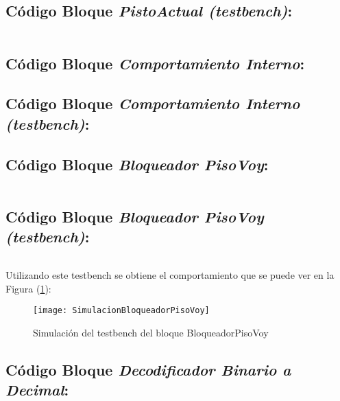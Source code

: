 \subsection{Código Bloque \textit{PistoActual (testbench)}:} \label{code:PisoActual_tb}
    \inputminted[frame=lines,fontsize=\footnotesize,linenos]{vhdl}{CodeFiles/PisoActual_tb.vhd}
    
\subsection{Código Bloque \textit{Comportamiento Interno}:} \label{code:ComportamientoInterno}

\subsection{Código Bloque \textit{Comportamiento Interno (testbench)}:} \label{code:ComportamientoInterno_tb}

\subsection{Código Bloque \textit{Bloqueador PisoVoy}:} \label{code:BloqueadorpisoVoy}	
    \inputminted[frame=lines,fontsize=\footnotesize,linenos]{vhdl}{CodeFiles/BloqueadorPisoVoy.vhd}

\subsection{Código Bloque \textit{Bloqueador PisoVoy (testbench)}:} \label{code:BloqueadorpisoVoy_tb}
    \inputminted[frame=lines,fontsize=\footnotesize,linenos]{vhdl}{CodeFiles/BloqueadorPisoVoy_tb.vhd}

    Utilizando este testbench se obtiene el comportamiento que se puede ver en la Figura (\ref{fig:SimulacionBloqueadorPisoVoy}):

    \begin{figure}[H]
		    \centering
		    \texttt{[image: SimulacionBloqueadorPisoVoy]}
		    \caption{Simulación del testbench del bloque BloqueadorPisoVoy}
		    \label{fig:SimulacionBloqueadorPisoVoy}
	\end{figure}

\subsection{Código Bloque \textit{Decodificador Binario a Decimal}:} \label{code:DecodificadorBinarioDecimal}
    \inputminted[frame=lines,fontsize=\footnotesize,linenos]{vhdl}{CodeFiles/DecodificadorBinarioDecimal.vhd}
    
